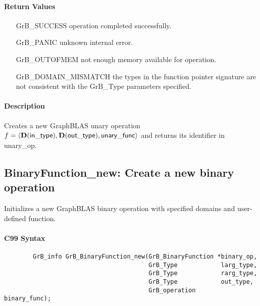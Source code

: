 \paragraph{Return Values}

\begin{itemize}[leftmargin=2.1in]
\item[{\sf GrB\_SUCCESS}]           operation completed successfully.
\item[{\sf GrB\_PANIC}]             unknown internal error.
\item[{\sf GrB\_OUTOFMEM}]          not enough memory available for operation.
\item[{\sf GrB\_DOMAIN\_MISMATCH}]  the types in the function pointer signature are not   
                                    consistent with the {\sf GrB\_Type} parameters specified.
\end{itemize}

\paragraph{Description}

Creates a new GraphBLAS unary operation $f = \langle \bold{D}({\sf in\_type}), 
\bold{D}({\sf out\_type}), {\sf unary\_func} \rangle$ and returns its identifier 
in {\sf unary\_op}.




\subsection{{\sf BinaryFunction\_new}: Create a new binary operation}

Initializes a new GraphBLAS binary operation with specified domains and user-defined function.

\paragraph{C99 Syntax}

\begin{verbatim}
        GrB_info GrB_BinaryFunction_new(GrB_BinaryFunction *binary_op,
                                        GrB_Type            larg_type,
                                        GrB_Type            rarg_type,
                                        GrB_Type            out_type,
                                        GrB_operation       binary_func);
\end{verbatim}

